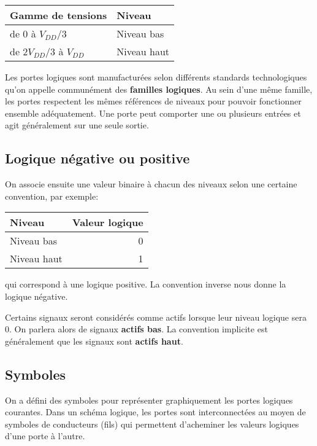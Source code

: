 \documentclass[11pt]{article}
\begin{document}
\begin{center}
\begin{tabular}{ll}
Gamme de tensions & Niveau\\[0pt]
\hline
de 0 à  \(V_{DD}/3\) & Niveau bas\\[0pt]
de \(2V_{DD}/3\) à  \(V_{DD}\) & Niveau haut\\[0pt]
\end{tabular}
\end{center}

Les portes logiques sont manufacturées selon différents standards
technologiques qu'on appelle communément des \textbf{familles logiques}. Au
sein d'une même famille, les portes respectent les mêmes références de
niveaux pour pouvoir fonctionner ensemble adéquatement. Une porte peut
comporter une ou plusieurs entrées et agit généralement sur une seule
sortie.

\subsection{Logique négative ou positive}
\label{sec:org4e9a281}

On associe ensuite une valeur binaire à chacun des niveaux selon une
certaine convention, par exemple:
\begin{center}
\begin{tabular}{lr}
Niveau & Valeur logique\\[0pt]
\hline
Niveau bas & 0\\[0pt]
Niveau haut & 1\\[0pt]
\end{tabular}
\end{center}
qui correspond à une logique positive. La convention inverse nous
donne la logique négative.

Certains signaux seront considérés comme actifs lorsque leur niveau
logique sera 0. On parlera alors de signaux \textbf{actifs bas}. La
convention implicite est généralement que les signaux sont \textbf{actifs
haut}.

\subsection{Symboles}
\label{sec:orgd320899}

On a défini des symboles pour représenter graphiquement les portes
logiques courantes. Dans un schéma logique, les portes sont
interconnectées au moyen de symboles de conducteurs
(fils) qui permettent d'acheminer les valeurs logiques d'une porte à
l'autre.
\end{document}
